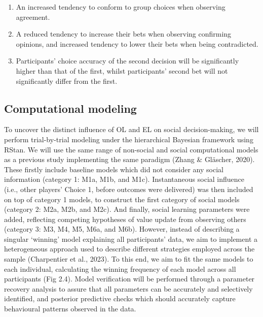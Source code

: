 \documentclass[12pt,a4paper,oneside,]{book} %
\begin{document}
\begin{enumerate}
\def\labelenumi{\arabic{enumi}.}
\item
  An increased tendency to conform to group choices when observing agreement.
\item
  A reduced tendency to increase their bets when observing confirming opinions, and increased tendency to lower their bets when being contradicted.
\item
  Participants' choice accuracy of the second decision will be significantly higher than that of the first, whilst participants' second bet will not significantly differ from the first.
\end{enumerate}

\subsection{Computational modeling}\label{computational-modeling}

To uncover the distinct influence of OL and EL on social decision-making, we will perform trial-by-trial modeling under the hierarchical Bayesian framework using RStan. We will use the same range of non-social and social computational models as a previous study implementing the same paradigm (Zhang \& Gläscher, 2020). These firstly include baseline models which did not consider any social information (category 1: M1a, M1b, and M1c). Instantaneous social influence (i.e., other players' Choice 1, before outcomes were delivered) was then included on top of category 1 models, to construct the first category of social models (category 2: M2a, M2b, and M2c). And finally, social learning parameters were added, reflecting competing hypotheses of value update from observing others (category 3: M3, M4, M5, M6a, and M6b). However, instead of describing a singular `winning' model explaining all participants' data, we aim to implement a heterogeneous approach used to describe different strategies employed across the sample (Charpentier et al., 2023). To this end, we aim to fit the same models to each individual, calculating the winning frequency of each model across all participants (Fig 2.4). Model verification will be performed through a parameter recovery analysis to assure that all parameters can be accurately and selectively identified, and posterior predictive checks which should accurately capture behavioural patterns observed in the data.
\end{document}
